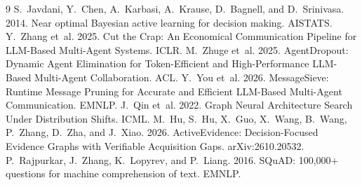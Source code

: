 \documentclass[11pt]{article}
\begin{document}
\begin{thebibliography}{9}
 S.~Javdani, Y.~Chen, A.~Karbasi, A.~Krause, D.~Bagnell, and D.~Srinivasa. 2014. Near optimal Bayesian active learning for decision making. AISTATS.
 Y.~Zhang et~al. 2025. Cut the Crap: An Economical Communication Pipeline for LLM-Based Multi-Agent Systems. ICLR.
 M.~Zhuge et~al. 2025. AgentDropout: Dynamic Agent Elimination for Token-Efficient and High-Performance LLM-Based Multi-Agent Collaboration. ACL.
 Y.~You et~al. 2026. MessageSieve: Runtime Message Pruning for Accurate and Efficient LLM-Based Multi-Agent Communication. EMNLP.
 J.~Qin et~al. 2022. Graph Neural Architecture Search Under Distribution Shifts. ICML.
 M.~Hu, S.~Hu, X.~Guo, X.~Wang, B.~Wang, P.~Zhang, D.~Zha, and J.~Xiao. 2026. ActiveEvidence: Decision-Focused Evidence Graphs with Verifiable Acquisition Gaps. arXiv:2610.20532.
 P.~Rajpurkar, J.~Zhang, K.~Lopyrev, and P.~Liang. 2016. SQuAD: 100,000+ questions for machine comprehension of text. EMNLP.
\end{thebibliography}
\end{document}
